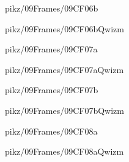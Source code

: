 \documentclass[9pt,xcolor={svgnames, x11names}]{beamer}
\begin{document}

\begin{frame}{pikz/09Frames/09CF06b}
  
\end{frame}


\begin{frame}{pikz/09Frames/09CF06bQwizm}
  
\end{frame}


\begin{frame}{pikz/09Frames/09CF07a}
  
\end{frame}


\begin{frame}{pikz/09Frames/09CF07aQwizm}
  
\end{frame}


\begin{frame}{pikz/09Frames/09CF07b}
  
\end{frame}


\begin{frame}{pikz/09Frames/09CF07bQwizm}
  
\end{frame}


\begin{frame}{pikz/09Frames/09CF08a}
  
\end{frame}


\begin{frame}{pikz/09Frames/09CF08aQwizm}
  
\end{frame}
\end{document}
